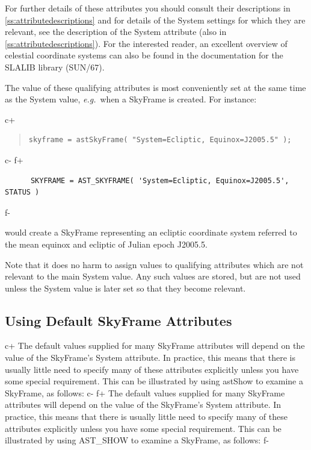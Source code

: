 \documentclass[twoside,11pt]{article}
\newcommand{\xref}[3]{#1}
\newcommand{\appref}[1]{Appendix~\ref{#1}}
\renewcommand{\appref}[1]{\ref{#1}}
\begin{document}
For further details of these attributes you should consult their
descriptions in \appref{ss:attributedescriptions} and for details of
the System settings for which they are relevant, see the description
of the System attribute (also in \appref{ss:attributedescriptions}).
For the interested reader, an excellent overview of celestial
coordinate systems can also be found in the documentation for the
SLALIB library (\xref{SUN/67}{sun67}{}).

The value of these qualifying attributes is most conveniently set at
the same time as the System value, {\em{e.g.}}\ when a SkyFrame is
created. For instance:

c+
\begin{quote}
\small
\begin{verbatim}
skyframe = astSkyFrame( "System=Ecliptic, Equinox=J2005.5" );
\end{verbatim}
\normalsize
\end{quote}
c-
f+
\small
\begin{verbatim}
      SKYFRAME = AST_SKYFRAME( 'System=Ecliptic, Equinox=J2005.5', STATUS )
\end{verbatim}
\normalsize
f-

would create a SkyFrame representing an ecliptic coordinate system
referred to the mean equinox and ecliptic of Julian epoch J2005.5.

Note that it does no harm to assign values to qualifying attributes
which are not relevant to the main System value. Any such values are
stored, but are not used unless the System value is later set so that
they become relevant.

\subsection{Using Default SkyFrame Attributes}

c+
The default values supplied for many SkyFrame attributes will depend
on the value of the SkyFrame's System attribute. In practice, this
means that there is usually little need to specify many of these
attributes explicitly unless you have some special requirement. This
can be illustrated by using astShow to examine a SkyFrame, as follows:
c-
f+
The default values supplied for many SkyFrame attributes will depend
on the value of the SkyFrame's System attribute. In practice, this
means that there is usually little need to specify many of these
attributes explicitly unless you have some special requirement. This
can be illustrated by using AST\_SHOW to examine a SkyFrame, as
follows:
f-
\end{document}
